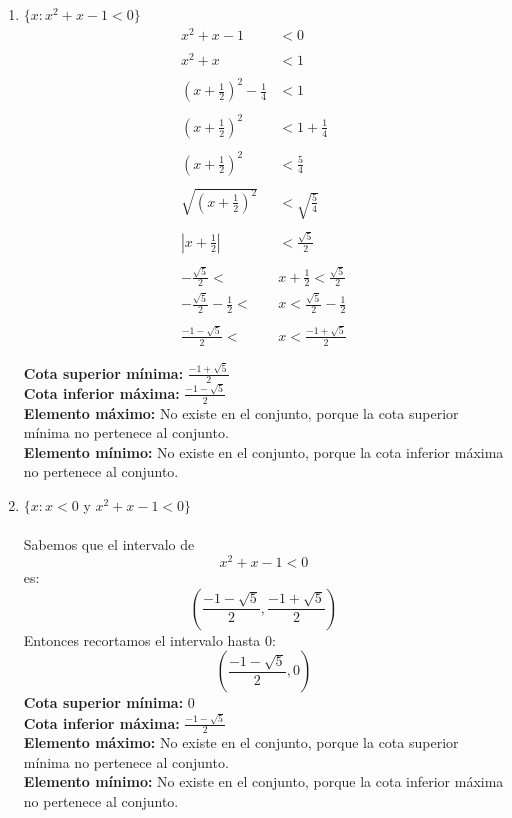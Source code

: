 \documentclass[12pt]{article}
\begin{document}
\begin{enumerate}[label=\textit{\roman*})]
    \item $\{x : x^2 + x - 1 < 0\}$ \\ 
        \begin{align*}
            x^2 + x - 1 &< 0 \\ \\
            x^2 + x &< 1 \\ \\
            (x + \frac{1}{2})^2 - \frac{1}{4} &< 1 \\ \\
            (x + \frac{1}{2})^2 &< 1 + \frac{1}{4} \\ \\
            (x + \frac{1}{2})^2 &< \frac{5}{4} \\ \\
            \sqrt{(x + \frac{1}{2})^2} &< \sqrt{\frac{5}{4}} \\ \\
            |x + \frac{1}{2}| &< \frac{\sqrt{5}}{2} \\ \\
            -\frac{\sqrt{5}}{2} < \, &x + \frac{1}{2} < \frac{\sqrt{5}}{2} \\
            -\frac{\sqrt{5}}{2} - \frac{1}{2} < \, &x < \frac{\sqrt{5}}{2} - \frac{1}{2} \\ \\
            \frac{-1 -\sqrt{5}}{2} <\, &x < \frac{-1 +\sqrt{5}}{2}
        \end{align*}

    \textbf{Cota superior mínima:} $\frac{-1 + \sqrt{5}}{2}$  \\
    \textbf{Cota inferior máxima:} $\frac{-1 - \sqrt{5}}{2}$ \\
    \textbf{Elemento máximo:} No existe en el conjunto, porque la cota superior
    mínima no pertenece al conjunto.\\
    \textbf{Elemento mínimo:} No existe en el conjunto, porque la cota inferior
    máxima no pertenece al conjunto.\\

    
    \item $\{x : x < 0$ y $x^2 + x - 1 < 0 \}$\\ \\
    Sabemos que el intervalo de 
        \[
            x^2 + x - 1 < 0
        \]
    es:    
        \[
            (\frac{-1 -\sqrt{5}}{2}, \frac{-1 +\sqrt{5}}{2})
        \]
    Entonces recortamos el intervalo hasta 0:
        \[
            (\frac{-1 -\sqrt{5}}{2}, 0)
        \]
    \textbf{Cota superior mínima:} $0$  \\
    \textbf{Cota inferior máxima:} $\frac{-1 - \sqrt{5}}{2}$ \\
    \textbf{Elemento máximo:} No existe en el conjunto, porque la cota superior
    mínima no pertenece al conjunto.\\
    \textbf{Elemento mínimo:} No existe en el conjunto, porque la cota 
    inferior máxima no pertenece al conjunto.\\


\end{enumerate}
\end{document}

